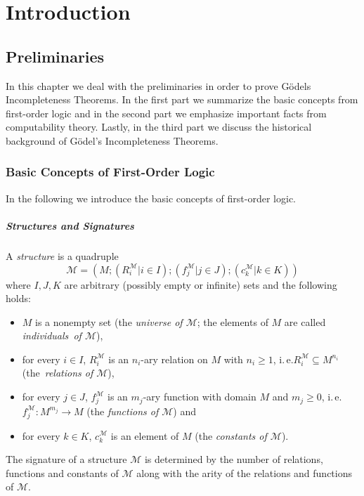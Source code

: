 \chapter{Introduction}

\section{Preliminaries}
\label{sec:preliminaries}
In this chapter we deal with the preliminaries in order to prove G\"odels Incompleteness Theorems. In the first part we summarize the basic concepts from first-order logic and in the second part we emphasize important facts from computability theory. Lastly, in the third part we discuss the historical background of G\"odel's Incompleteness Theorems.
\subsection{Basic Concepts of First-Order Logic}
In the following we introduce the  basic concepts of first-order logic.
\paragraph{Structures and Signatures}
A \textit{structure} is a quadruple \[\mathcal{M} = (M; (R_i^\mathcal{M} | i \in I); (f_j^\mathcal{M}| j \in J); (c_k^\mathcal{M} | k \in K)) \] where $I, J, K$ are arbitrary (possibly empty or infinite) sets and the following holds:
\begin{itemize}
\item $M$ is a nonempty set (the \textit{universe of $\mathcal{M}$}; the elements of $M$ are called  \textit{individuals~of $\mathcal{M}$}), 
\item for every $i \in I$, $R_i^\mathcal{M}$ is an $n_i$-ary relation on $M$ with $n_i \ge 1$, i.\,e.\@ $R_i^\mathcal{M} \subseteq M^{n_i}$ (the~\textit{relations of $\mathcal{M}$}),
\item for every $j \in J$, $f_j^\mathcal{M}$ is an $m_j$-ary function with domain $M$ and $m_j \ge 0$, i.\,e.\@ $f_j^\mathcal{M} : M^{m_j} \rightarrow M$ (the \textit{functions of $\mathcal{M}$}) and
\item for every $k \in K$, $c_k^\mathcal{M}$ is an element of $M$ (the \textit{constants  of $\mathcal{M}$}).
\end{itemize}

The signature of a structure $\mathcal{M}$ is determined by the number of relations, functions and constants of $\mathcal{M}$ along with the arity of the relations and functions of $\mathcal{M}$. 

